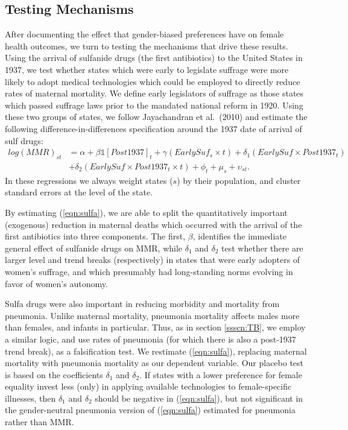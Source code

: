 \documentclass[11pt]{article}
\begin{document}
\begin{spacing}{1.4}
\subsection{Testing Mechanisms}
After documenting the effect that gender-biased preferences have on female
health outcomes, we turn to testing the mechanisms that drive these results.
Using the arrival of sulfanide drugs (the first antibiotics) to the United 
States in 1937, we test whether states which were early to legislate suffrage 
were more likely to adopt medical technologies which could be employed to 
directly reduce rates of maternal mortality. We define early legislators of 
suffrage as those states which passed suffrage laws prior to the mandated 
national reform in 1920.  Using these two groups of states, we follow 
Jayachandran et al.\ (2010) and estimate the following difference-in-differences 
specification around the 1937 date of arrival of sulf drugs:
\begin{eqnarray}
\label{eqn:sulfa}
log(MMR)_{st} & = \alpha + \beta \mathds{1}[Post1937]_t + \gamma(EarlySuf_{s}\times t)
                + \delta_1 (EarlySuf\times Post1937_t) \nonumber \\
              & + \delta_2 (EarlySuf\times Post1937_t\times t) + \phi_t + \mu_s
                + \upsilon_{st}.
\end{eqnarray}
In these regressions we always weight states ($s$) by their population, and 
cluster standard errors at the level of the state.

By estimating (\ref{eqn:sulfa}), we are able to split the quantitatively 
important (exogenous) 
reduction in maternal deaths which occurred with the arrival of the first 
antibiotics into three components.  The first, $\beta$, identifies the immediate 
general effect of sulfanide drugs on MMR, while $\delta_1$ and $\delta_2$ test 
whether there are larger level and trend breaks (respectively) in states that 
were early adopters of women's suffrage, and which presumably had long-standing 
norms evolving in favor of women's autonomy.

Sulfa drugs were also important in reducing morbidity and mortality from 
pneumonia.  Unlike maternal mortality, pneumonia mortality affects males 
more than females, and infants in particular.  Thus, as in section 
\ref{ssscn:TB}, we employ a similar logic, and use rates of pneumonia (for 
which there is also a post-1937 trend break), as a falsification test.  We 
restimate (\ref{eqn:sulfa}), replacing maternal mortality with pneumonia 
mortality as our dependent variable.  Our placebo test is based on the 
coefficients $\delta_1$ and $\delta_2$.  If states with a lower preference for 
female equality invest less (only) in applying available technologies to 
female-specific illnesses, then $\delta_1$ and $\delta_2$ should be negative in 
(\ref{eqn:sulfa}), but not significant in the gender-neutral pneumonia version
of (\ref{eqn:sulfa}) estimated for pneumonia rather than MMR.


\end{spacing}
\end{document}
